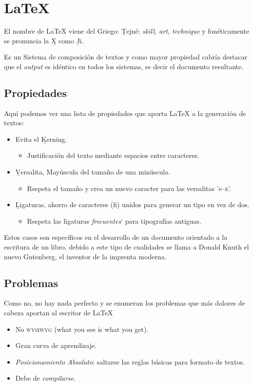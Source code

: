 \documentclass[11pt]{article}
\begin{document}
\section{\LaTeX{}}

El nombre de \LaTeX{} viene del Griego: \b{Tejné}: \emph{skill, art, technique} y fon\'eticamente se pronuncia la \b{X} como \b{Ji}.

Es un Sistema de composici\'on de textos y como mayor propiedad cabría destacar que el \emph{output} es id\'entico en todos los sistemas, es decir el documento resultante.

\subsection{Propiedades}

Aqu\'i podemos ver una lista de propiedades que aporta \LaTeX{} a la generaci\'on de textos:

\begin{itemize}
	\item Evita el \b{Kerning}.
	\begin{itemize}
		\item Justificaci\'on del texto mediante espacios entre caracteres.
	\end{itemize}
	\item \b{Versalita}, May\'uscula del tamaño de una min\'uscula.
	\begin{itemize}
		\item Respeta el tamaño y crea un nuevo caracter para las versalitas 'e--\textsc{e}'.
	\end{itemize}
	\item \b{Ligaturas}, ahorro de caracteres (fi) unidos para generar un tipo en vez de dos.
	\begin{itemize}
		\item Respeta las ligaturas \emph{frecuentes}` para tipograf\'ias antiguas.
	\end{itemize}
\end{itemize}

Estos casos son espec\'ificos en el desarrollo de un documento orientado a la escritura de un libro, debido a este tipo de cualidades se llama a Donald Knuth el nuevo Gutenberg, el inventor de la imprenta moderna.

\subsection{Problemas}

Como no, no hay nada perfecto y se enumeran los problemas que m\'as dolores de cabeza aportan al escritor de \LaTeX{}
\begin{itemize}
	\item No \textsc{wysiwyg} (what you see is what you get).
	\item Gran curva de aprendizaje.
	\item \emph{Posicionamiento Absoluto}: saltarse las reglas b\'asicas para formato de textos.
	\item Debe de \emph{compilarse}.
\end{itemize}
\end{document}
